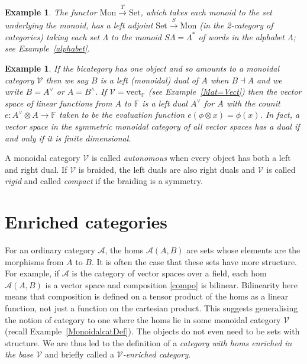 \documentclass[a4paper,12pt]{article}
\newtheorem{example}[theorem]{Example}
\theoremstyle{step}
\newcommand{\xra}{\xrightarrow}
\def\CA{{\mathscr A}}
\def\CV{{\mathscr V}}
\def\ot{{\otimes}}
\begin{document}
\begin{example} The functor $\mathrm{Mon}\xra{T} \mathrm{Set}$, which takes each monoid
to the set underlying the monoid, has a left adjoint $\mathrm{Set}\xra{S} \mathrm{Mon}$ 
(in the 2-category of categories) taking
each set $\Lambda$ to the monoid $S\Lambda = \Lambda^*$ of words in the alphabet
$\Lambda$; see Example~\ref{alphabet}. 
\end{example}

\begin{example}\label{monoidaldual} If the bicategory has one object and so amounts to a 
monoidal category $\CV$ then we say $B$ is a {\em left (monoidal) dual of $A$}
when $B\dashv A$ and we write $B = A^{\vee}$ or $A = B^{\wedge}$. 
If $\CV = \mathrm{vect}_{\mathbb{F}}$ (see Example~\ref{Mat=Vect}) 
then the vector space of linear functions from $A$ to $\mathbb{F}$ is a 
left dual $A^{\vee}$ for $A$ with the counit $e : A^{\vee}\ot A\to \mathbb{F}$
taken to be the evaluation function $e(\phi \ot x) = \phi(x)$. In fact, a vector space
in the symmetric monoidal category of all vector spaces has a dual if and only if
it is finite dimensional.    
\end{example}

A monoidal category $\CV$ is called {\em autonomous} when every object has both a left and right dual. If $\CV$ is braided, the left duals are also right duals and $\CV$ is called {\em rigid}
and called {\em compact} if the braiding is a symmetry. 

\section{Enriched categories}\label{enriched}

For an ordinary category $\CA$, the homs $\CA(A,B)$ are sets whose elements are the
morphisms from $A$ to $B$. It is often the case that these sets have more structure.
For example, if $\CA$ is the category of vector spaces over a field, each hom $\CA(A,B)$
is a vector space and composition \eqref{compo} is bilinear. Bilinearity here means that
composition is defined on a tensor product of the homs as a linear function, not just a function on the cartesian product. This suggests generalising the notion of category to one where
the homs lie in some monoidal category $\CV$ (recall Example~\ref{MonoidalcatDef}). The objects do not even need to be sets with structure. We are thus led to the definition of a {\em category with homs enriched in the base $\CV$} and briefly called a {\em $\CV$-enriched category}.  
\end{document}
